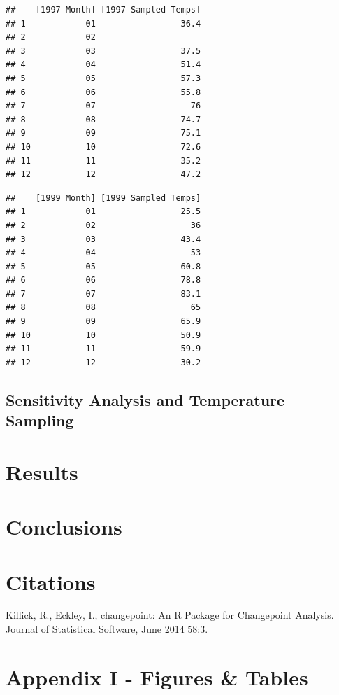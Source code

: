 \documentclass[]{article}
\begin{document}
\begin{verbatim}
##    [1997 Month] [1997 Sampled Temps]
## 1            01                 36.4
## 2            02                     
## 3            03                 37.5
## 4            04                 51.4
## 5            05                 57.3
## 6            06                 55.8
## 7            07                   76
## 8            08                 74.7
## 9            09                 75.1
## 10           10                 72.6
## 11           11                 35.2
## 12           12                 47.2
\end{verbatim}

\begin{verbatim}
##    [1999 Month] [1999 Sampled Temps]
## 1            01                 25.5
## 2            02                   36
## 3            03                 43.4
## 4            04                   53
## 5            05                 60.8
## 6            06                 78.8
## 7            07                 83.1
## 8            08                   65
## 9            09                 65.9
## 10           10                 50.9
## 11           11                 59.9
## 12           12                 30.2
\end{verbatim}

\subsection{Sensitivity Analysis and Temperature
Sampling}\label{sensitivity-analysis-and-temperature-sampling}

\section{Results}\label{results}

\section{Conclusions}\label{conclusions}

\section{Citations}\label{citations}

Killick, R., Eckley, I., changepoint: An R Package for Changepoint
Analysis. Journal of Statistical Software, June 2014 58:3.

\section{Appendix I - Figures \&
Tables}\label{appendix-i---figures-tables}
\end{document}
